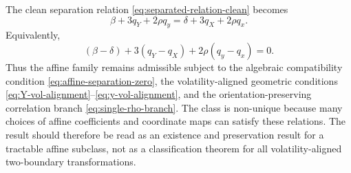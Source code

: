 \documentclass[11pt]{article}
\numberwithin{equation}{section}
\begin{document}
The clean separation relation \eqref{eq:separated-relation-clean} becomes
\begin{equation}
\label{eq:affine-separation}
\beta+3q_Y+2\rho q_y
=
\delta+3q_X+2\rho q_x.
\end{equation}
Equivalently,
\begin{equation}
\label{eq:affine-separation-zero}
(\beta-\delta)+3(q_Y-q_X)+2\rho(q_y-q_x)=0.
\end{equation}
Thus the affine family remains admissible subject to the algebraic compatibility condition \eqref{eq:affine-separation-zero}, the volatility-aligned geometric conditions \eqref{eq:Y-vol-alignment}--\eqref{eq:y-vol-alignment}, and the orientation-preserving correlation branch \eqref{eq:single-rho-branch}. The class is non-unique because many choices of affine coefficients and coordinate maps can satisfy these relations. The result should therefore be read as an existence and preservation result for a tractable affine subclass, not as a classification theorem for all volatility-aligned two-boundary transformations.
\end{document}
